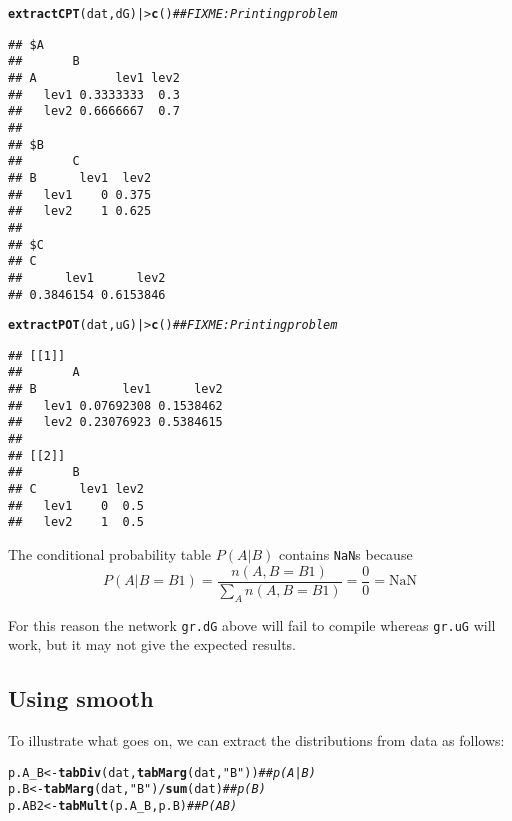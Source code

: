 \documentclass[10pt]{article}\usepackage[]{graphicx}\usepackage[]{xcolor}
\makeatletter
\newcommand{\hlstr}[1]{\textcolor[rgb]{0.192,0.494,0.8}{#1}}%
\newcommand{\hlcom}[1]{\textcolor[rgb]{0.678,0.584,0.686}{\textit{#1}}}%
\newcommand{\hlopt}[1]{\textcolor[rgb]{0,0,0}{#1}}%
\newcommand{\hlstd}[1]{\textcolor[rgb]{0.345,0.345,0.345}{#1}}%
\newcommand{\hlkwb}[1]{\textcolor[rgb]{0.69,0.353,0.396}{#1}}%
\newcommand{\hlkwd}[1]{\textcolor[rgb]{0.737,0.353,0.396}{\textbf{#1}}}%
\newenvironment{kframe}{%
 \def\at@end@of@kframe{}%
 \ifinner\ifhmode%
  \def\at@end@of@kframe{\end{minipage}}%
  \begin{minipage}{\columnwidth}%
 \fi\fi%
 \def\FrameCommand##1{\hskip\@totalleftmargin \hskip-\fboxsep
 \colorbox{shadecolor}{##1}\hskip-\fboxsep
     \hskip-\linewidth \hskip-\@totalleftmargin \hskip\columnwidth}%
 \MakeFramed {\advance\hsize-\width
   \@totalleftmargin\z@ \linewidth\hsize
   \@setminipage}}%
 {\par\unskip\endMakeFramed%
 \at@end@of@kframe}
\newenvironment{knitrout}{}{} %
\def\code#1{{\texttt{#1}}}
\makeatother
\begin{document}
\begin{knitrout}
\color{fgcolor}\begin{kframe}
\begin{alltt}
\hlkwd{extractCPT}\hlstd{(dat, dG) |>} \hlkwd{c}\hlstd{()} \hlcom{## FIXME: Printing problem}
\end{alltt}
\begin{verbatim}
## $A
##       B
## A           lev1 lev2
##   lev1 0.3333333  0.3
##   lev2 0.6666667  0.7
## 
## $B
##       C
## B      lev1  lev2
##   lev1    0 0.375
##   lev2    1 0.625
## 
## $C
## C
##      lev1      lev2 
## 0.3846154 0.6153846
\end{verbatim}
\begin{alltt}
\hlkwd{extractPOT}\hlstd{(dat, uG) |>} \hlkwd{c}\hlstd{()} \hlcom{## FIXME: Printing problem}
\end{alltt}
\begin{verbatim}
## [[1]]
##       A
## B            lev1      lev2
##   lev1 0.07692308 0.1538462
##   lev2 0.23076923 0.5384615
## 
## [[2]]
##       B
## C      lev1 lev2
##   lev1    0  0.5
##   lev2    1  0.5
\end{verbatim}
\end{kframe}
\end{knitrout}

The conditional probability table $P(A|B)$ contains \code{NaN}s
because
\begin{displaymath}
  P(A|B=B1)=\frac{n(A,B=B1)}{\sum_A n(A,B=B1)} = \frac{0}{0} = \mbox{NaN}
\end{displaymath}

For this reason the network \code{gr.dG} above will fail to compile
whereas \code{gr.uG} will work, but it may not give the expected results.

\subsection{Using smooth}
\label{sec:using-smooth}

To illustrate what goes on, we can extract the distributions from data
as follows:

\begin{knitrout}
\color{fgcolor}\begin{kframe}
\begin{alltt}
\hlstd{p.A_B} \hlkwb{<-} \hlkwd{tabDiv}\hlstd{(dat,} \hlkwd{tabMarg}\hlstd{(dat,} \hlstr{"B"}\hlstd{))} \hlcom{## p(A|B)}
\hlstd{p.B}   \hlkwb{<-} \hlkwd{tabMarg}\hlstd{(dat,} \hlstr{"B"}\hlstd{)} \hlopt{/} \hlkwd{sum}\hlstd{(dat)}   \hlcom{## p(B)}
\hlstd{p.AB2} \hlkwb{<-} \hlkwd{tabMult}\hlstd{(p.A_B, p.B)}            \hlcom{## P(AB)}
\end{alltt}
\end{kframe}
\end{knitrout}
\end{document}
